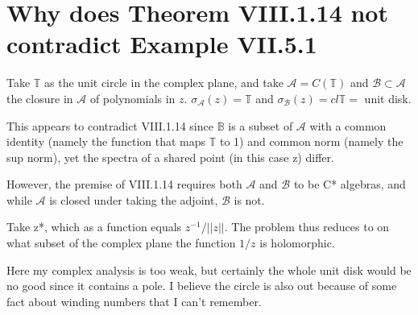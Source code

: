 \documentclass{article}
\begin{document}
\section{Why does Theorem VIII.1.14 not contradict Example VII.5.1}

Take $\mathbb{T}$ as the unit circle in the complex plane, and take $\mathscr{A} = C(\mathbb{T})$ and $\mathscr{B}\subset \mathscr{A}$ the closure in $\mathscr{A}$ of polynomials in $z$. $\sigma_{\mathscr{A}}(z)=\mathbb{T}$ and $\sigma_{\mathscr{B}}(z)= cl \mathbb{T} =$ unit disk.

This appears to contradict VIII.1.14 since $\mathbb{B}$ is a subset of $\mathscr{A}$ with a common identity (namely the function that maps $\mathbb{T}$ to 1) and common norm (namely the sup norm), yet the spectra of a shared point (in this case z) differ.

However, the premise of VIII.1.14  requires both $\mathscr{A}$ and $\mathscr{B}$ to be C* algebras, and while $\mathscr{A}$ is closed under taking the adjoint, $\mathscr{B}$ is not.

Take z*, which as a function equals $z^{-1}/||z||$. The problem thus reduces to on what subset of the complex plane the function $1/z$ is holomorphic.

Here my complex analysis is too weak, but certainly the whole unit disk would be no good since it contains a pole. I believe the circle is also out because of some fact about winding numbers that I can't remember.
\end{document}
